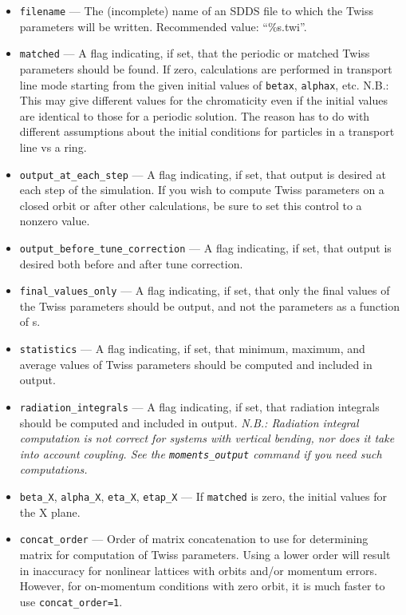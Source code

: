 \documentclass[11pt]{article}
\begin{document}
\begin{itemize}
\item \verb|filename| --- The (incomplete) name of an SDDS file to which the Twiss parameters will be written.
 Recommended value: ``\%s.twi''.
\item \verb|matched| --- A flag indicating, if set, that the periodic or matched Twiss parameters should be found.
  If zero, calculations are performed in transport line mode starting from the given initial values of \verb|betax|, \verb|alphax|, etc. 
  N.B.: This may give different values for the chromaticity even if the initial values are identical to those for a periodic solution.
  The reason has to do with different assumptions about the initial conditions for particles in a transport line vs a ring.
\item \verb|output_at_each_step| --- A flag indicating, if set, that output is desired at each step of the simulation.
  If you wish to compute Twiss parameters on a closed orbit or after other calculations, be sure to set this control to a nonzero value.
\item \verb|output_before_tune_correction| --- A flag indicating, if set, that output is desired both before and after
tune correction.
\item \verb|final_values_only| --- A flag indicating, if set, that only the final values of the Twiss parameters should
be output, and not the parameters as a function of s.
\item \verb|statistics| --- A flag indicating, if set, that minimum, maximum, and average values of
Twiss parameters should be computed and included in output.
\item \verb|radiation_integrals| --- A flag indicating, if set, that radiation integrals should be computed
and included in output. {\em N.B.: Radiation integral computation is not correct for systems with vertical
bending, nor does it take into account coupling.  See the \verb|moments_output| command if you need such
computations.}
\item \verb|beta_X|, \verb|alpha_X|, \verb|eta_X|, \verb|etap_X| --- If \verb|matched| is zero, the initial values for
the X plane.

\item \verb|concat_order| --- Order of matrix concatenation to use for
determining matrix for computation of Twiss parameters.  Using a lower
order will result in inaccuracy for nonlinear lattices with orbits
and/or momentum errors.  However, for on-momentum conditions with zero
orbit, it is much faster to use \verb|concat_order=1|.


\end{itemize}
\end{document}
